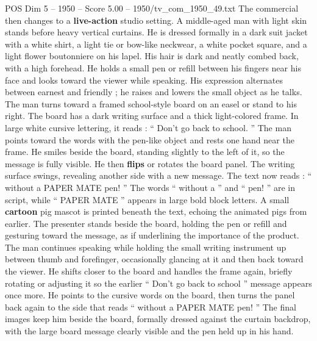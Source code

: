 \begin{textsample}{POS Dim 5 – 1950 – Score 5.00 – 1950/tv\_com\_1950\_49.txt}
The commercial then changes to a \textbf{live-action} studio setting.
A middle-aged man with light skin stands before heavy vertical curtains.
He is dressed formally in a dark suit jacket with a white shirt, a light tie or bow-like neckwear, a white pocket square, and a light flower boutonniere on his lapel.
His hair is dark and neatly combed back, with a high forehead.
He holds a small pen or refill between his fingers near his face and looks toward the viewer while speaking.
His expression alternates between earnest and friendly ; he raises and lowers the small object as he talks.
The man turns toward a framed school-style board on an easel or stand to his right.
The board has a dark writing surface and a thick light-colored frame.
In large white cursive lettering, it reads : “ Don't go back to school. ” The man points toward the words with the pen-like object and rests one hand near the frame.
He smiles beside the board, standing slightly to the left of it, so the message is fully visible.
He then \textbf{flips} or rotates the board panel.
The writing surface swings, revealing another side with a new message.
The text now reads : “ without a PAPER MATE pen! ” The words “ without a ” and “ pen! ” are in script, while “ PAPER MATE ” appears in large bold block letters.
A small \textbf{cartoon} pig mascot is printed beneath the text, echoing the animated pigs from earlier.
The presenter stands beside the board, holding the pen or refill and gesturing toward the message, as if underlining the importance of the product.
The man continues speaking while holding the small writing instrument up between thumb and forefinger, occasionally glancing at it and then back toward the viewer.
He shifts closer to the board and handles the frame again, briefly rotating or adjusting it so the earlier “ Don't go back to school ” message appears once more.
He points to the cursive words on the board, then turns the panel back again to the side that reads “ without a PAPER MATE pen! ” The final images keep him beside the board, formally dressed against the curtain backdrop, with the large board message clearly visible and the pen held up in his hand.

\end{textsample}

